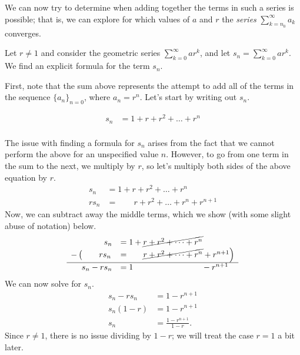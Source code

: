 \documentclass{ximera}
\begin{document}
We can now try to determine when adding together the terms in such a series is possible; that is, we can explore for which values of $a$ and $r$ the \emph{series} $\sum_{k=n_0}^{\infty} a_k$ converges.  

\begin{model}
 Let $r \neq 1$ and consider the geometric series $\sum_{k=0}^\infty a r^k$, and let $s_n = \sum_{k=0}^{\infty} a r^k $.  We find an explicit formula for the term $s_n$.
  
  \begin{explanation}
First, note that the sum above represents the attempt to add all of the terms in the sequence $\{a_n\}_{n=0}$, where $a_n =  r^n$.  Let's start by writing out $s_n$.  

    \begin{align*}
      s_n   &= 1 + r + r^2 + \dots + r^n\\
    \end{align*}

The issue with finding a formula for $s_n$ arises from the fact that we cannot perform the above for an unspecified value $n$.  However, to go from one term in the sum to the next, we multiply by $r$, so let's multiply both sides of the above equation by $r$.
    \begin{align*}
      s_n   &= 1 + r + r^2 + \dots + r^n\\
      r s_n &= ~ \phantom{ 1 + } r + r^2 + \dots + r^n + r^{n+1}
    \end{align*}
Now, we can subtract away the middle terms, which we show (with some slight abuse of notation) below.
 \[     \begin{array}{rl}
      s_n   &= 1 + \cancel{ r + r^2 + \dots + r^n}\\
 -\left(  \phantom{ r^{n+1}} r s_n \right.&=~ \left. \phantom{  1 +  } \cancel{r + r^2 + \dots + r^n} + r^{n+1}\right) \\
 \hline 
     s_n - r s_n &= 1 \phantom{  +  r + r^2 + \dots + r^n } ~ - r^{n+1}\\
    \end{array}
 \]   
 We can now solve for $s_n$.
     \begin{align*}
      s_n - r s_n &= 1 - r^{n+1}\\
      s_n(1-r)    &= 1 - r^{n+1}\\
      s_n &= \frac{1 - r^{n+1}}{1-r}.
    \end{align*}
    Since $r \ne 1$, there is no issue dividing by $1-r$; we will treat the case $r=1$ a bit later.
  \end{explanation}
\end{model}
\end{document}
